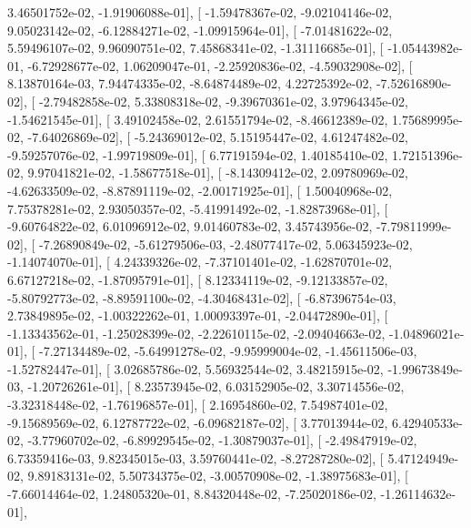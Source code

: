 \documentclass{article}
\begin{document}
          3.46501752e-02,  -1.91906088e-01],
       [ -1.59478367e-02,  -9.02104146e-02,   9.05023142e-02,
         -6.12884271e-02,  -1.09915964e-01],
       [ -7.01481622e-02,   5.59496107e-02,   9.96090751e-02,
          7.45868341e-02,  -1.31116685e-01],
       [ -1.05443982e-01,  -6.72928677e-02,   1.06209047e-01,
         -2.25920836e-02,  -4.59032908e-02],
       [  8.13870164e-03,   7.94474335e-02,  -8.64874489e-02,
          4.22725392e-02,  -7.52616890e-02],
       [ -2.79482858e-02,   5.33808318e-02,  -9.39670361e-02,
          3.97964345e-02,  -1.54621545e-01],
       [  3.49102458e-02,   2.61551794e-02,  -8.46612389e-02,
          1.75689995e-02,  -7.64026869e-02],
       [ -5.24369012e-02,   5.15195447e-02,   4.61247482e-02,
         -9.59257076e-02,  -1.99719809e-01],
       [  6.77191594e-02,   1.40185410e-02,   1.72151396e-02,
          9.97041821e-02,  -1.58677518e-01],
       [ -8.14309412e-02,   2.09780969e-02,  -4.62633509e-02,
         -8.87891119e-02,  -2.00171925e-01],
       [  1.50040968e-02,   7.75378281e-02,   2.93050357e-02,
         -5.41991492e-02,  -1.82873968e-01],
       [ -9.60764822e-02,   6.01096912e-02,   9.01460783e-02,
          3.45743956e-02,  -7.79811999e-02],
       [ -7.26890849e-02,  -5.61279506e-03,  -2.48077417e-02,
          5.06345923e-02,  -1.14074070e-01],
       [  4.24339326e-02,  -7.37101401e-02,  -1.62870701e-02,
          6.67127218e-02,  -1.87095791e-01],
       [  8.12334119e-02,  -9.12133857e-02,  -5.80792773e-02,
         -8.89591100e-02,  -4.30468431e-02],
       [ -6.87396754e-03,   2.73849895e-02,  -1.00322262e-01,
          1.00093397e-01,  -2.04472890e-01],
       [ -1.13343562e-01,  -1.25028399e-02,  -2.22610115e-02,
         -2.09404663e-02,  -1.04896021e-01],
       [ -7.27134489e-02,  -5.64991278e-02,  -9.95999004e-02,
         -1.45611506e-03,  -1.52782447e-01],
       [  3.02685786e-02,   5.56932544e-02,   3.48215915e-02,
         -1.99673849e-03,  -1.20726261e-01],
       [  8.23573945e-02,   6.03152905e-02,   3.30714556e-02,
         -3.32318448e-02,  -1.76196857e-01],
       [  2.16954860e-02,   7.54987401e-02,  -9.15689569e-02,
          6.12787722e-02,  -6.09682187e-02],
       [  3.77013944e-02,   6.42940533e-02,  -3.77960702e-02,
         -6.89929545e-02,  -1.30879037e-01],
       [ -2.49847919e-02,   6.73359416e-03,   9.82345015e-03,
          3.59760441e-02,  -8.27287280e-02],
       [  5.47124949e-02,   9.89183131e-02,   5.50734375e-02,
         -3.00570908e-02,  -1.38975683e-01],
       [ -7.66014464e-02,   1.24805320e-01,   8.84320448e-02,
         -7.25020186e-02,  -1.26114632e-01],
\end{document}
